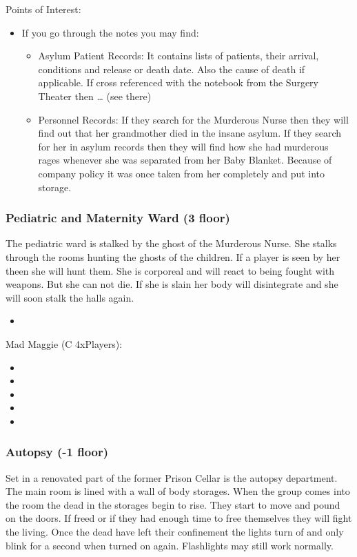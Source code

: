 \documentclass[11pt]{article}
\begin{document}
{Points of Interest:
\begin{itemize}
\item If you go through the notes you may find:
\begin{itemize}
\item Asylum Patient Records: It contains lists of patients, their arrival, conditions and release or death date. Also the cause of death if applicable. If cross referenced with the notebook from the Surgery Theater then \ldots{} (see there)
\item Personnel Records: If they search for the Murderous Nurse then they will find out that her grandmother died in the insane asylum. If they search for her in asylum records then they will find how she had murderous rages whenever she was separated from her Baby Blanket. Because of company policy it was once taken from her completely and put into storage.
\end{itemize}
\end{itemize}
\subsubsection{Pediatric and Maternity Ward (3 floor)}
\label{sec:orgad14fcc}

The pediatric ward is stalked by the ghost of the Murderous Nurse. She stalks through the rooms hunting the ghosts of the children. If a player is seen by her theen she will hunt them. She is corporeal and will react to being fought with weapons. But she can not die. If she is slain her body will disintegrate and she will soon stalk the halls again.

\begin{itemize}
\item {}
\end{itemize}

Mad Maggie (C 4xPlayers):
\begin{itemize}
\item {}
\item {}
\item {}
\item {}
\item {}
\end{itemize}
\subsubsection{Autopsy (-1 floor)}
\label{sec:orgaf62214}
Set in a renovated part of the former Prison Cellar is the autopsy department. The main room is lined with a wall of body storages.
When the group comes into the room the dead in the storages begin to rise. They start to move and pound on the doors. If freed or if they had enough time to free themselves they will fight the living. Once the dead have left their confinement the lights turn of and only blink for a second when turned on again. Flashlights may still work normally.

}
\end{document}

